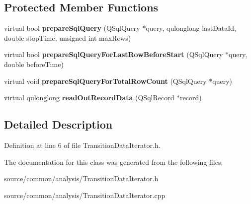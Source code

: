 \subsection*{Protected Member Functions}
\begin{DoxyCompactItemize}
\item 
\hypertarget{class_picto_1_1_transition_data_iterator_ab11a18f02d8de78d5978615fec54c1d5}{virtual bool {\bfseries prepare\-Sql\-Query} (Q\-Sql\-Query $\ast$query, qulonglong last\-Data\-Id, double stop\-Time, unsigned int max\-Rows)}\label{class_picto_1_1_transition_data_iterator_ab11a18f02d8de78d5978615fec54c1d5}

\item 
\hypertarget{class_picto_1_1_transition_data_iterator_ac9867ac8b426a9a69cb22c1763ed889b}{virtual bool {\bfseries prepare\-Sql\-Query\-For\-Last\-Row\-Before\-Start} (Q\-Sql\-Query $\ast$query, double before\-Time)}\label{class_picto_1_1_transition_data_iterator_ac9867ac8b426a9a69cb22c1763ed889b}

\item 
\hypertarget{class_picto_1_1_transition_data_iterator_a113205c1b3473e88626696fed0c42984}{virtual void {\bfseries prepare\-Sql\-Query\-For\-Total\-Row\-Count} (Q\-Sql\-Query $\ast$query)}\label{class_picto_1_1_transition_data_iterator_a113205c1b3473e88626696fed0c42984}

\item 
\hypertarget{class_picto_1_1_transition_data_iterator_a82562cc01250a1bf2b7b68ad6bf9776b}{virtual qulonglong {\bfseries read\-Out\-Record\-Data} (Q\-Sql\-Record $\ast$record)}\label{class_picto_1_1_transition_data_iterator_a82562cc01250a1bf2b7b68ad6bf9776b}

\end{DoxyCompactItemize}


\subsection{Detailed Description}


Definition at line 6 of file Transition\-Data\-Iterator.\-h.



The documentation for this class was generated from the following files\-:\begin{DoxyCompactItemize}
\item 
source/common/analysis/Transition\-Data\-Iterator.\-h\item 
source/common/analysis/Transition\-Data\-Iterator.\-cpp\end{DoxyCompactItemize}
